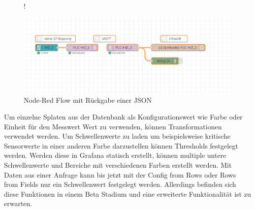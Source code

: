\documentclass[a4paper, 12pt, oneside]{scrbook}
\begin{document}
 		\begin{figure} [H]
 			\centering
 			\resizebox{\linewidth} {!} {
 				\includegraphics{res/nodered.png}
 				
 			}
 			\caption{Node-Red Flow mit Rückgabe einer JSON}
 			\label{fig:nodered}
 		\end{figure}
 	
	 	
	 	
	 	
	 	\noindent Um einzelne Splaten aus der Datenbank als Konfigurationswert wie Farbe oder Einheit für den Messwert Wert zu verwenden, können Transformationen verwendet werden. Um Schwellenwerte zu laden um beispielsweise kritische Sensorwerte in einer anderen Farbe darzustellen können Thresholds festgelegt werden. Werden diese in Grafana statisch erstellt, können multiple untere Schwellenwerte und Bereiche mit verschiedenen Farben erstellt werden. Mit Daten aus einer Anfrage kann bis jetzt mit der \glqq Config from Rows\grqq{} oder \glqq Rows from Fields\grqq{} nur ein Schwellenwert festgelegt werden. Allerdings befinden sich diese Funktionen in einem Beta Stadium und eine erweiterte Funktionalität ist zu erwarten. \cite{GrafanaLabs:Thresholds}
	 	
\end{document}
